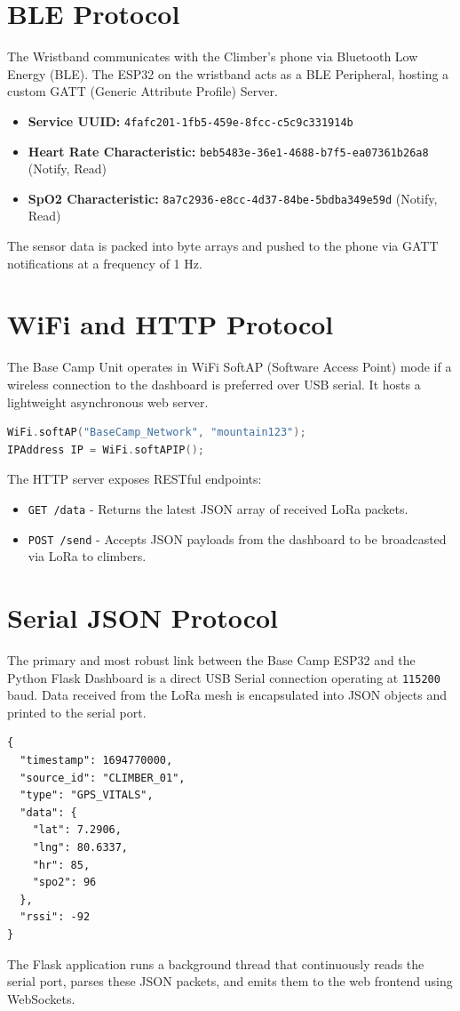 \section{BLE Protocol}
The Wristband communicates with the Climber's phone via Bluetooth Low Energy (BLE). 
The ESP32 on the wristband acts as a BLE Peripheral, hosting a custom GATT (Generic Attribute Profile) Server.
\begin{itemize}
    \item \textbf{Service UUID:} \texttt{4fafc201-1fb5-459e-8fcc-c5c9c331914b}
    \item \textbf{Heart Rate Characteristic:} \texttt{beb5483e-36e1-4688-b7f5-ea07361b26a8} (Notify, Read)
    \item \textbf{SpO2 Characteristic:} \texttt{8a7c2936-e8cc-4d37-84be-5bdba349e59d} (Notify, Read)
\end{itemize}
The sensor data is packed into byte arrays and pushed to the phone via GATT notifications at a frequency of 1 Hz.

\section{WiFi and HTTP Protocol}
The Base Camp Unit operates in WiFi SoftAP (Software Access Point) mode if a wireless connection to the dashboard is preferred over USB serial. It hosts a lightweight asynchronous web server.
\begin{lstlisting}[language=C++, caption={ESP32 SoftAP Configuration Snippet}]
WiFi.softAP("BaseCamp_Network", "mountain123");
IPAddress IP = WiFi.softAPIP();
\end{lstlisting}
The HTTP server exposes RESTful endpoints:
\begin{itemize}
    \item \texttt{GET /data} - Returns the latest JSON array of received LoRa packets.
    \item \texttt{POST /send} - Accepts JSON payloads from the dashboard to be broadcasted via LoRa to climbers.
\end{itemize}

\section{Serial JSON Protocol}
The primary and most robust link between the Base Camp ESP32 and the Python Flask Dashboard is a direct USB Serial connection operating at \texttt{115200} baud. Data received from the LoRa mesh is encapsulated into JSON objects and printed to the serial port.

\begin{lstlisting}[caption={Example Serial JSON Packet}]
{
  "timestamp": 1694770000,
  "source_id": "CLIMBER_01",
  "type": "GPS_VITALS",
  "data": {
    "lat": 7.2906,
    "lng": 80.6337,
    "hr": 85,
    "spo2": 96
  },
  "rssi": -92
}
\end{lstlisting}
The Flask application runs a background thread that continuously reads the serial port, parses these JSON packets, and emits them to the web frontend using WebSockets.
